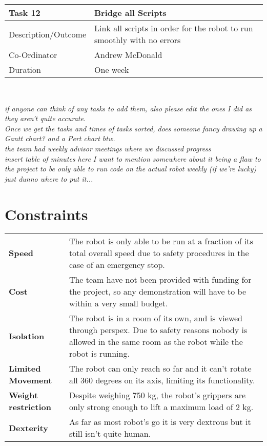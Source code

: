 \documentclass{l3proj}
\begin{document}
\vspace{2mm}

\begin{tabular}{|p{5cm}|p{9cm}|}
\hline
Task 12 & Bridge all Scripts\\
\hline
Description/Outcome & Link all scripts in order for the robot to run smoothly with no errors \\
\hline
Co-Ordinator & Andrew McDonald\\
\hline
Duration & One week\\
\hline
\end{tabular}\\

\vspace{2mm}

\textit{if anyone can think of any tasks to add them, also please edit the ones I did as they aren't quite accurate.\\ 
Once we get the tasks and times of tasks sorted, does someone fancy drawing up a Gantt chart?  and a Pert chart btw.\\
the team had weekly advisor meetings where we discussed progress \\
insert table of minutes here I want to mention somewhere about it being a flaw to the project to be only able to run code on the actual robot weekly (if we’re lucky) just dunno where to put it...}
\\
\section{Constraints}

\begin{tabular}{l p{12cm}}
\textbf {Speed} & The robot is only able to be run at a fraction of its total overall speed due to safety procedures in the case of an emergency stop.\\
\textbf {Cost} & The team have not been provided with funding for the project, so any demonstration will have to be within a very small budget.\\
\textbf {Isolation} & The robot is in a room of its own, and is viewed through perspex. Due to safety reasons nobody is allowed in the same room as the robot while the robot is running.\\
\textbf {Limited Movement} & The robot can only reach so far and it can't rotate all 360 degrees on its axis, limiting its functionality.\\
\textbf {Weight restriction} & Despite weighing 750 kg, the robot's grippers are only strong enough to lift a maximum load of 2 kg. \\
\textbf {Dexterity} & As far as most robot’s go it is very dextrous but it still isn’t quite human.\\
\end{tabular}
\end{document}

